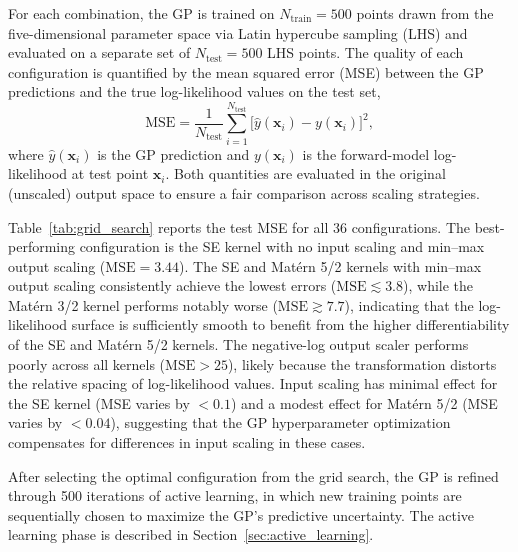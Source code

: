 For each combination, the GP is trained on $N_{\mathrm{train}} = 500$
points drawn from the five-dimensional parameter space via Latin
hypercube sampling (LHS) and evaluated on a separate set of
$N_{\mathrm{test}} = 500$ LHS points. The quality of each
configuration is quantified by the mean squared error (MSE) between
the GP predictions and the true log-likelihood values on the test set,
\begin{equation}
  \mathrm{MSE} = \frac{1}{N_{\mathrm{test}}}
  \sum_{i=1}^{N_{\mathrm{test}}}
  \bigl[\hat{y}(\mathbf{x}_{i}) - y(\mathbf{x}_{i})\bigr]^{2},
  \label{eq:mse}
\end{equation}
where $\hat{y}(\mathbf{x}_{i})$ is the GP prediction and
$y(\mathbf{x}_{i})$ is the forward-model log-likelihood at test point
$\mathbf{x}_{i}$. Both quantities are evaluated in the original
(unscaled) output space to ensure a fair comparison across scaling
strategies.

Table~\ref{tab:grid_search} reports the test MSE for all 36
configurations. The best-performing configuration is the SE kernel
with no input scaling and min--max output scaling
($\mathrm{MSE} = 3.44$). The SE and Mat\'{e}rn 5/2 kernels with
min--max output scaling consistently achieve the lowest errors
($\mathrm{MSE} \lesssim 3.8$), while the Mat\'{e}rn 3/2 kernel
performs notably worse ($\mathrm{MSE} \gtrsim 7.7$), indicating that
the log-likelihood surface is sufficiently smooth to benefit from the
higher differentiability of the SE and Mat\'{e}rn 5/2 kernels. The
negative-log output scaler performs poorly across all kernels
($\mathrm{MSE} > 25$), likely because the transformation distorts the
relative spacing of log-likelihood values. Input scaling has minimal
effect for the SE kernel (MSE varies by $< 0.1$) and a modest effect
for Mat\'{e}rn 5/2 (MSE varies by $< 0.04$), suggesting that the GP
hyperparameter optimization compensates for differences in input
scaling in these cases.

After selecting the optimal configuration from the grid search, the
GP is refined through 500 iterations of active learning, in which new
training points are sequentially chosen to maximize the GP's
predictive uncertainty. The active learning phase is described in
Section~\ref{sec:active_learning}.
